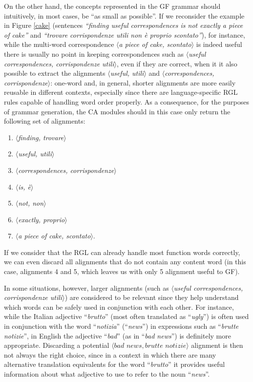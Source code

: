 On the other hand, the concepts represented in the GF grammar should intuitively, in most cases, be ``as small as possible''. If we reconsider the example in Figure \ref{cake} (sentences \textit{``finding useful correspondences is not exactly a piece of cake''} and \textit{``trovare corrispondenze utili non è proprio scontato''}), for instance, while the multi-word correspondence $\langle$\textit{a piece of cake, scontato}$\rangle$ is indeed useful there is usually no point in keeping correspondences such as $\langle$\textit{useful correspondences, corrispondenze utili}$\rangle$, even if they are correct, when it it also possible to extract the alignments $\langle$\textit{useful, utili}$\rangle$ and $\langle$\textit{correspondences, corrispondenze}$\rangle$: one-word and, in general, shorter alignments are more easily reusable in different contexts, especially since there are language-specific RGL rules capable of handling word order properly. 
As a consequence, for the purposes of grammar generation, the CA modules should in this case only return the following set of alignments: \smallskip

\begin{enumerate}
    \item $\langle$\textit{finding, trovare}$\rangle$
    \item $\langle$\textit{useful, utili}$\rangle$
    \item $\langle$\textit{correspondences, corrispondenze}$\rangle$
    \item $\langle$\textit{is, è}$\rangle$
    \item $\langle$\textit{not, non}$\rangle$
    \item $\langle$\textit{exactly, proprio}$\rangle$
    \item $\langle$\textit{a piece of cake, scontato}$\rangle$.
\end{enumerate} \smallskip

If we consider that the RGL can already handle most function words correctly, we can even discard all alignments that do not contain any content word (in this case, alignments 4 and 5, which leaves us with only 5 alignment useful to GF). \smallskip

In some situations, however, larger alignments (such as $\langle$\textit{useful correspondences, corrispondenze utili}$\rangle$) are considered to be relevant since they help understand which words can be safely used in conjunction with each other. For instance, while the Italian adjective ``\textit{brutto}'' (most often translated as ``\textit{ugly}'') is often used in conjunction with the word ``\textit{notizia}'' (``\textit{news}'') in expressions such as ``\textit{brutte notizie}'', in English the adjective ``\textit{bad}'' (as in ``\textit{bad news}'') is definitely more appropriate. Discarding a potential $\langle\textit{bad news}, \textit{brutte notizie}\rangle$ alignment is then not always the right choice, since in a context in which there are many alternative translation equivalents for the word ``\textit{brutto}'' it provides useful information about what adjective to use to refer to the noun ``\textit{news}''. \smallskip


